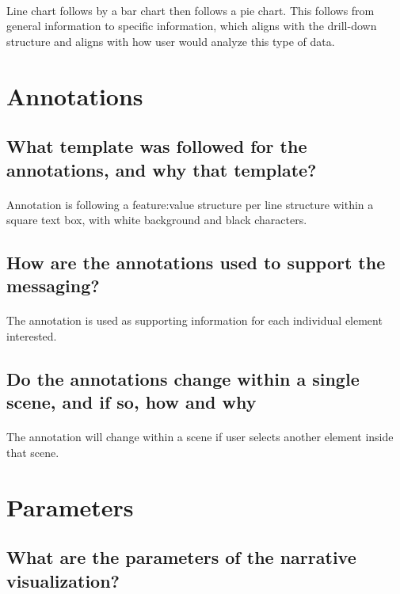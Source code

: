 \documentclass[letterpaper, 11pt]{article}
\begin{document}
\paragraph{}Line chart follows by a bar chart then follows a pie chart. This follows from general information to specific information, which aligns with the drill-down structure and aligns with how user would analyze this type of data.

\section{Annotations}
\label{sec:Annotations}
\subsection{What template was followed for the annotations, and why that template?}
\label{subsec:Annotations1}
\paragraph{}Annotation is following a feature:value structure per line structure  within a square text box, with white background and black characters.
\subsection{How are the annotations used to support the messaging?}
\label{subsec:Annotations2}
\paragraph{}The annotation is used as supporting information for each individual element interested.

\subsection{Do the annotations change within a single scene, and if so, how and why}
\label{subsec:Annotations3}
\paragraph{}The annotation will change within a scene if user selects another element inside that scene.

\section{Parameters}
\label{sec:Parameters}
\subsection{What are the parameters of the narrative visualization?}
\label{subsec:Parameters1}
\end{document}
